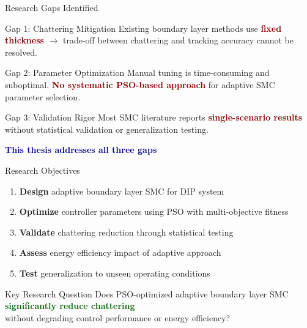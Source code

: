 \documentclass[10pt,aspectratio=169]{beamer}
\newcommand{\highlight}[1]{\textcolor{darkblue}{\textbf{#1}}}
\newcommand{\emphred}[1]{\textcolor{darkred}{\textbf{#1}}}
\newcommand{\emphgreen}[1]{\textcolor{darkgreen}{\textbf{#1}}}
\begin{document}
\begin{frame}{Research Gaps Identified}
\begin{block}{Gap 1: Chattering Mitigation}
Existing boundary layer methods use \emphred{fixed thickness} $\rightarrow$ trade-off between chattering and tracking accuracy cannot be resolved.
\end{block}

\begin{block}{Gap 2: Parameter Optimization}
Manual tuning is time-consuming and suboptimal. \emphred{No systematic PSO-based approach} for adaptive SMC parameter selection.
\end{block}

\begin{block}{Gap 3: Validation Rigor}
Most SMC literature reports \emphred{single-scenario results} without statistical validation or generalization testing.
\end{block}

\vspace{0.3cm}
\centering
\highlight{This thesis addresses all three gaps}
\end{frame}

\begin{frame}{Research Objectives}
\begin{enumerate}
    \item \textbf{Design} adaptive boundary layer SMC for DIP system
    \item \textbf{Optimize} controller parameters using PSO with multi-objective fitness
    \item \textbf{Validate} chattering reduction through statistical testing
    \item \textbf{Assess} energy efficiency impact of adaptive approach
    \item \textbf{Test} generalization to unseen operating conditions
\end{enumerate}

\vspace{0.5cm}
\begin{alertblock}{Key Research Question}
\centering
Does PSO-optimized adaptive boundary layer SMC \emphgreen{significantly reduce chattering} \\
without degrading control performance or energy efficiency?
\end{alertblock}
\end{frame}
\end{document}
